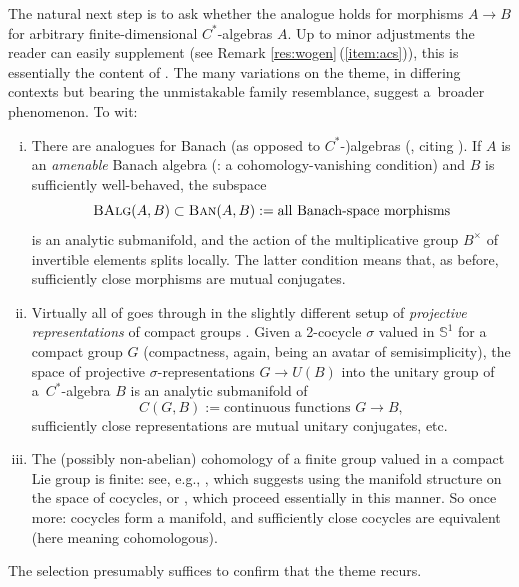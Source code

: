 \documentclass[pdftex]{sigma}
\numberwithin{equation}{section}
\newcommand\bS{{\mathbb S}}
\newcommand{\cat}[1]{\text{\sc #1}}
\begin{document}
The natural next step is to ask whether the analogue holds for morphisms $A\to B$ for arbitrary finite-dimensional $C^*$-algebras $A$. Up to minor adjustments the reader can easily supplement (see Remark \ref{res:wogen}\,(\ref{item:acs})), this is essentially the content of \cite[Proposition~2.2]{acs}. The many variations on the theme, in differing contexts but bearing the unmistakable family resemblance, suggest a~broader phenomenon. To wit:
\begin{enumerate}[(i)]\itemsep=0pt
\item\label{item:8} There are analogues for Banach (as opposed to $C^*$-)algebras (\cite[Proposition 8.2.2 and Theorem 8.2.3]{run-lec}, citing \cite[Proposition~4.1 and Theorem~4.5]{cg-amen}).
 If $A$ is an {\it amenable} Banach algebra (\cite[Definition 2.1.9]{run-lec}: a cohomology-vanishing condition) and $B$ is sufficiently well-behaved, the subspace
 \begin{equation*}
 \cat{BAlg}(A,B)\subset \cat{Ban}(A,B):=\text{all Banach-space morphisms}
 \end{equation*}
 is an analytic submanifold, and the action of the multiplicative group $B^{\times}$ of invertible elements splits locally. The latter condition means that, as before, sufficiently close morphisms are mutual conjugates.


\item\label{item:9} Virtually all of goes through in the slightly different setup of {\it projective representations} of compact groups \cite[Propositions~1.7, 2.2 and~2.3]{mart-proj}.
 Given a 2-cocycle $\sigma$ valued in $\bS^1$ for a compact group $G$ (compactness, again, being an avatar of semisimplicity), the space of projective $\sigma$-representations \cite[Section~1.4]{mart-proj} $G\to U(B)$ into the unitary group of a~$C^*$-algebra $B$ is an analytic submanifold of
 \begin{equation*}
 C(G,B):=\text{continuous functions }G\to B,
 \end{equation*}
 sufficiently close representations are mutual unitary conjugates, etc.

\item\label{item:10} The (possibly non-abelian) cohomology of a finite group valued in a compact Lie group is finite: see, e.g., \cite[Part~II, Chapter~IV, Exercise~1]{ser-lag}, which suggests using the manifold structure on the space of cocycles, or \cite[Theorems~1.1 and~1.2 and Corollary~1.1]{aw-nonab}, which proceed essentially in this manner.
 So once more: cocycles form a manifold, and sufficiently close cocycles are equivalent (here meaning cohomologous).
\end{enumerate}
The selection presumably suffices to confirm that the theme recurs.
\end{document}
